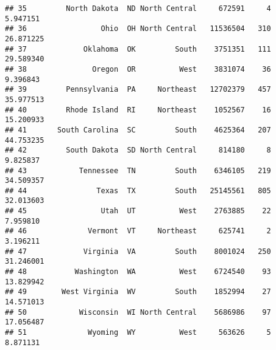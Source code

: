 \documentclass[
]{article}
\begin{document}
\begin{verbatim}
## 35         North Dakota  ND North Central     672591     4   5.947151
## 36                 Ohio  OH North Central   11536504   310  26.871225
## 37             Oklahoma  OK         South    3751351   111  29.589340
## 38               Oregon  OR          West    3831074    36   9.396843
## 39         Pennsylvania  PA     Northeast   12702379   457  35.977513
## 40         Rhode Island  RI     Northeast    1052567    16  15.200933
## 41       South Carolina  SC         South    4625364   207  44.753235
## 42         South Dakota  SD North Central     814180     8   9.825837
## 43            Tennessee  TN         South    6346105   219  34.509357
## 44                Texas  TX         South   25145561   805  32.013603
## 45                 Utah  UT          West    2763885    22   7.959810
## 46              Vermont  VT     Northeast     625741     2   3.196211
## 47             Virginia  VA         South    8001024   250  31.246001
## 48           Washington  WA          West    6724540    93  13.829942
## 49        West Virginia  WV         South    1852994    27  14.571013
## 50            Wisconsin  WI North Central    5686986    97  17.056487
## 51              Wyoming  WY          West     563626     5   8.871131
\end{verbatim}
\end{document}

